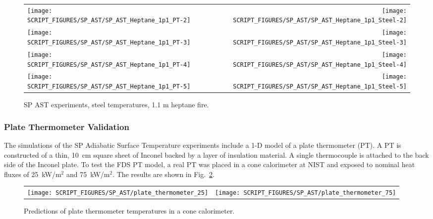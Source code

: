 \begin{figure}[p]
\begin{tabular*}{\textwidth}{l@{\extracolsep{\fill}}r}
\texttt{[image: SCRIPT\_FIGURES/SP\_AST/SP\_AST\_Heptane\_1p1\_PT-2]} &  \texttt{[image: SCRIPT\_FIGURES/SP\_AST/SP\_AST\_Heptane\_1p1\_Steel-2]}  \\
\texttt{[image: SCRIPT\_FIGURES/SP\_AST/SP\_AST\_Heptane\_1p1\_PT-3]} &  \texttt{[image: SCRIPT\_FIGURES/SP\_AST/SP\_AST\_Heptane\_1p1\_Steel-3]}  \\
\texttt{[image: SCRIPT\_FIGURES/SP\_AST/SP\_AST\_Heptane\_1p1\_PT-4]} &  \texttt{[image: SCRIPT\_FIGURES/SP\_AST/SP\_AST\_Heptane\_1p1\_Steel-4]}  \\
\texttt{[image: SCRIPT\_FIGURES/SP\_AST/SP\_AST\_Heptane\_1p1\_PT-5]} &  \texttt{[image: SCRIPT\_FIGURES/SP\_AST/SP\_AST\_Heptane\_1p1\_Steel-5]}
\end{tabular*}
\caption{SP AST experiments, steel temperatures, 1.1 m heptane fire.}
\label{SP_Heptane_1p1_PT_Steel}
\end{figure}

\clearpage

\subsubsection{Plate Thermometer Validation}

The simulations of the SP Adiabatic Surface Temperature experiments include a 1-D model of a plate thermometer (PT). A PT is constructed of a thin, 10~cm square sheet of Inconel backed by a layer of insulation material. A single thermocouple is attached to the back side of the Inconel plate. To test the FDS PT model, a real PT was placed in a cone calorimeter at NIST and exposed to nominal heat fluxes of 25~kW/m$^2$ and 75~kW/m$^2$. The results are shown in Fig.~\ref{plate_thermometers}.

\begin{figure}[!h]
\begin{tabular*}{\textwidth}{l@{\extracolsep{\fill}}r}
\texttt{[image: SCRIPT\_FIGURES/SP\_AST/plate\_thermometer\_25]}  &  \texttt{[image: SCRIPT\_FIGURES/SP\_AST/plate\_thermometer\_75]}
\end{tabular*}
\caption[Predictions of plate thermometer temperatures in a cone calorimeter]{Predictions of plate thermometer temperatures in a cone calorimeter.}
\label{plate_thermometers}
\end{figure}

